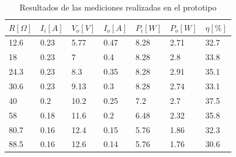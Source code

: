 \begin{table}[H]
    \centering
    \begin{tabular}{lllllll}
        \hline
        \multicolumn{1}{c}{$R[\Omega]$} & \multicolumn{1}{c}{$I_i[A]$} & \multicolumn{1}{c}{$V_o[V]$} & \multicolumn{1}{c}{$I_o[A]$} & \multicolumn{1}{c}{$P_i[W]$} & \multicolumn{1}{c}{$P_o[W]$} & \multicolumn{1}{c}{$\eta[\%]$} \\ \hline
        12.6                            & 0.23                         & 5.77                         & 0.47                         & 8.28                         & 2.71                         & 32.7                           \\
        18                              & 0.23                         & 7                            & 0.4                          & 8.28                         & 2.8                          & 33.8                           \\
        24.3                            & 0.23                         & 8.3                          & 0.35                         & 8.28                         & 2.91                         & 35.1                           \\
        30.6                            & 0.23                         & 9.13                         & 0.3                          & 8.28                         & 2.74                         & 33.1                           \\
        40                              & 0.2                          & 10.2                         & 0.25                         & 7.2                          & 2.7                          & 37.5                           \\
        58                              & 0.18                         & 11.6                         & 0.2                          & 6.48                         & 2.32                         & 35.8                           \\
        80.7                            & 0.16                         & 12.4                         & 0.15                         & 5.76                         & 1.86                         & 32.3                           \\
        88.5                            & 0.16                         & 12.6                         & 0.14                         & 5.76                         & 1.76                         & 30.6                           \\ \hline
    \end{tabular}
    \caption{Resultados de las mediciones realizadas en el prototipo}
    \label{tab:mediciones}
\end{table}

